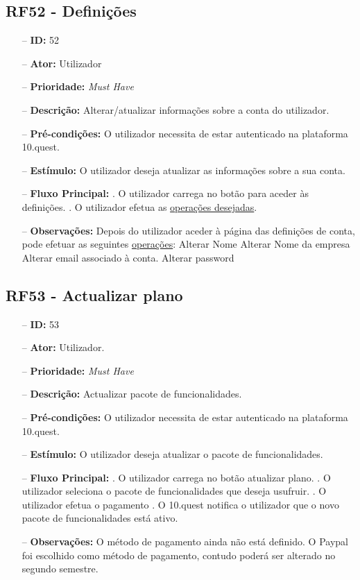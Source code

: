 \subsection{RF52 - Definições}
\begin{itemize}
	\item[--] \textbf{ID:} 52
	\item[--]  \textbf{Ator:} Utilizador
	\item[--]  \textbf{Prioridade:} \textit{Must Have}
	\item[--]  \textbf{Descrição:} Alterar/atualizar informações sobre a conta do utilizador.
	\item[--]  \textbf{Pré-condições:} O utilizador necessita de estar autenticado na plataforma 10.quest.
	\item[--]  \textbf{Estímulo:} O utilizador deseja atualizar as informações sobre a sua conta.
	\item[--]  \textbf{Fluxo Principal:} 
	. O utilizador carrega no botão para aceder às definições.
	. O utilizador efetua as \underline{operações desejadas}.
	\item[--]  \textbf{Observações:} Depois do utilizador aceder à página das definições de conta, pode efetuar as seguintes \underline{operações}:
		\subitem Alterar Nome
		\subitem Alterar Nome da empresa
		\subitem Alterar email associado à conta.
		\subitem Alterar password
\end{itemize}
\newpage


\subsection{RF53 - Actualizar plano}
\begin{itemize}
	\item[--] \textbf{ID:} 53
	\item[--]  \textbf{Ator:} Utilizador.
	\item[--]  \textbf{Prioridade:} \textit{Must Have}
	\item[--]  \textbf{Descrição:} Actualizar pacote de funcionalidades.
	\item[--]  \textbf{Pré-condições:} O utilizador necessita de estar autenticado na plataforma 10.quest.
	\item[--]  \textbf{Estímulo:} O utilizador deseja atualizar o pacote de funcionalidades.
	\item[--]  \textbf{Fluxo Principal:} 
	. O utilizador carrega no botão atualizar plano.
	. O utilizador seleciona o pacote de funcionalidades que deseja usufruir.
	. O utilizador efetua o pagamento
	. O 10.quest notifica o utilizador que o novo pacote de funcionalidades está ativo.
	\item[--]  \textbf{Observações:} O método de pagamento ainda não está definido. O Paypal foi escolhido como método de pagamento, contudo poderá ser alterado no segundo semestre.
\end{itemize}
\newpage

